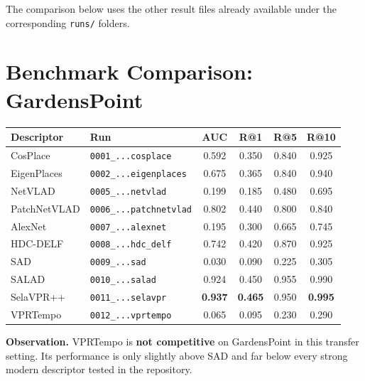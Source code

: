 \documentclass[11pt]{article}
\begin{document}
The comparison below uses the other result files already available under the corresponding \texttt{runs/} folders.

\section*{Benchmark Comparison: GardensPoint}
\begin{center}
\begin{tabularx}{\textwidth}{L{2.8cm} Y c c c c}
\toprule
\textbf{Descriptor} & \textbf{Run} & \textbf{AUC} & \textbf{R@1} & \textbf{R@5} & \textbf{R@10} \\
\midrule
CosPlace & \texttt{0001\_...cosplace} & 0.592 & 0.350 & 0.840 & 0.925 \\
EigenPlaces & \texttt{0002\_...eigenplaces} & 0.675 & 0.365 & 0.840 & 0.940 \\
NetVLAD & \texttt{0005\_...netvlad} & 0.199 & 0.185 & 0.480 & 0.695 \\
PatchNetVLAD & \texttt{0006\_...patchnetvlad} & 0.802 & 0.440 & 0.800 & 0.840 \\
AlexNet & \texttt{0007\_...alexnet} & 0.195 & 0.300 & 0.665 & 0.745 \\
HDC-DELF & \texttt{0008\_...hdc\_delf} & 0.742 & 0.420 & 0.870 & 0.925 \\
SAD & \texttt{0009\_...sad} & 0.030 & 0.090 & 0.225 & 0.305 \\
SALAD & \texttt{0010\_...salad} & 0.924 & 0.450 & 0.955 & 0.990 \\
SelaVPR++ & \texttt{0011\_...selavpr} & \textbf{0.937} & \textbf{0.465} & 0.950 & \textbf{0.995} \\
VPRTempo & \texttt{0012\_...vprtempo} & 0.065 & 0.095 & 0.230 & 0.290 \\
\bottomrule
\end{tabularx}
\end{center}

\textbf{Observation.} VPRTempo is \textbf{not competitive} on GardensPoint in this transfer setting. Its performance is only slightly above SAD and far below every strong modern descriptor tested in the repository.
\end{document}
